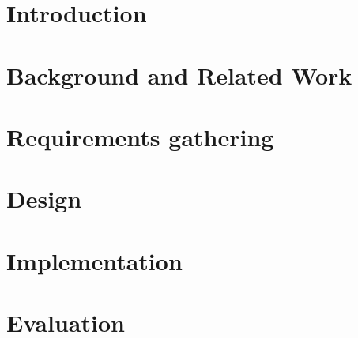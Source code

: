 \documentclass{l4proj}
\begin{document}
\chapter{Introduction}

\chapter{Background and Related Work} %
\label{cha:background}




\chapter{Requirements gathering} %
\label{cha:requirements_gathering}






\chapter{Design} %
\label{cha:design}









\chapter{Implementation} %
\label{cha:implementation}





\chapter{Evaluation} %
\label{cha:evaluation}

\end{document}
